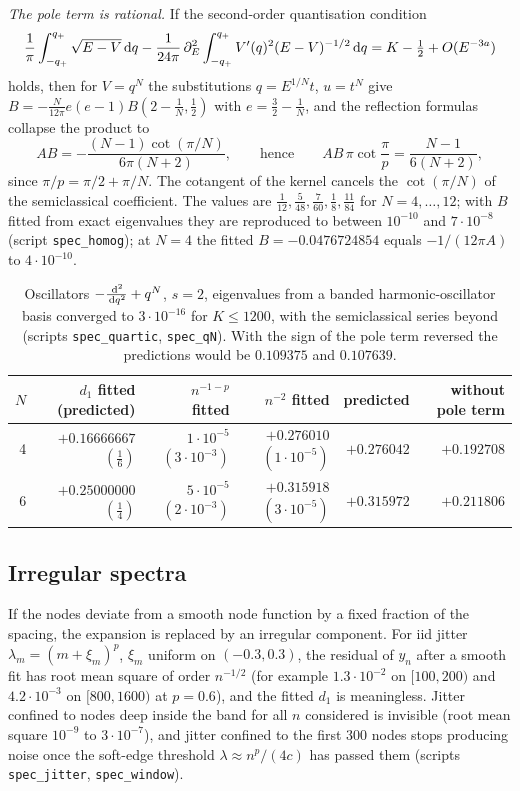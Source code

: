 \emph{The pole term is rational.} If the second-order quantisation condition
\[
  \frac1\pi\int_{-q_+}^{q_+}\sqrt{E-V}\,\mathrm{d} q-\frac1{24\pi}\,\partial_E^2\int_{-q_+}^{q_+}V'(q)^2(E-V)^{-1/2}\,\mathrm{d} q=K-\tfrac12+O(E^{-3a})
\]
holds, then for $V=q^N$ the substitutions $q=E^{1/N}t$, $u=t^N$ give $B=-\frac N{12\pi}e(e-1)B(2-\frac1N,\frac12)$ with
$e=\frac32-\frac1N$, and the reflection formulas collapse the product to
\[
  AB=-\frac{(N-1)\cot(\pi/N)}{6\pi(N+2)},\qquad\text{hence}\qquad AB\,\pi\cot\frac\pi p=\frac{N-1}{6(N+2)},
\]
since $\pi/p=\pi/2+\pi/N$. The cotangent of the kernel cancels the $\cot(\pi/N)$ of the semiclassical coefficient. The
values are $\frac1{12},\frac5{48},\frac7{60},\frac18,\frac{11}{84}$ for $N=4,\dots,12$; with $B$ fitted from exact eigenvalues they
are reproduced to between $10^{-10}$ and $7\cdot10^{-8}$ (script \texttt{spec\_homog}); at $N=4$ the fitted
$B=-0.0476724854$ equals $-1/(12\pi A)$ to $4\cdot10^{-10}$.

\begin{table}[ht]
\centering
\small
\begin{tabular}{rrrrrr}
\toprule
$N$ & $d_1$ fitted (predicted) & $n^{-1-p}$ fitted & $n^{-2}$ fitted & predicted & without pole term\\
\midrule
4 & $+0.16666667$ $(\frac16)$ & $1\cdot10^{-5}$ $(3\cdot10^{-3})$ & $+0.276010$ $(1\cdot10^{-5})$ & $+0.276042$ & $+0.192708$\\
6 & $+0.25000000$ $(\frac14)$ & $5\cdot10^{-5}$ $(2\cdot10^{-3})$ & $+0.315918$ $(3\cdot10^{-5})$ & $+0.315972$ & $+0.211806$\\
\bottomrule
\end{tabular}
\caption{Oscillators $-\frac{\,\mathrm{d}^2}{\,\mathrm{d} q^2}+q^N$, $s=2$, eigenvalues from a banded harmonic-oscillator basis converged to
$3\cdot10^{-16}$ for $K\le1200$, with the semiclassical series beyond (scripts \texttt{spec\_quartic}, \texttt{spec\_qN}). With the
sign of the pole term reversed the predictions would be $0.109375$ and $0.107639$.}
\label{tab:quartic}
\end{table}

\subsection{Irregular spectra}\label{sec:noise}
If the nodes deviate from a smooth node function by a fixed fraction of the spacing, the expansion is replaced by an
irregular component. For iid jitter $\lambda_m=(m+\xi_m)^p$, $\xi_m$ uniform on $(-0.3,0.3)$, the residual of $y_n$ after a smooth
fit has root mean square of order $n^{-1/2}$ (for example $1.3\cdot10^{-2}$ on $[100,200)$ and $4.2\cdot10^{-3}$ on $[800,1600)$ at
$p=0.6$), and the fitted $d_1$ is meaningless. Jitter confined to nodes deep inside the band for all $n$ considered is
invisible (root mean square $10^{-9}$ to $3\cdot10^{-7}$), and jitter confined to the first $300$ nodes stops producing noise once
the soft-edge threshold $\lambda\approx n^p/(4c)$ has passed them (scripts \texttt{spec\_jitter}, \texttt{spec\_window}).

